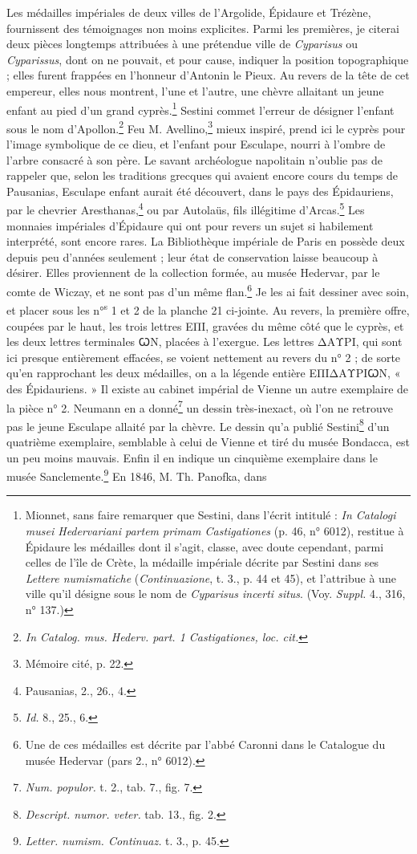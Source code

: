 \documentclass{article}
\begin{document}
Les médailles impériales de deux villes de l'Argolide, Épidaure et Trézène, fournissent des témoignages non moins explicites. Parmi les premières, je citerai deux pièces longtemps attribuées à une prétendue ville de \emph{Cyparisus} ou \emph{Cyparissus}, dont on ne pouvait, et pour cause, indiquer la position topographique ; elles furent frappées en l'honneur d'Antonin le Pieux. Au revers de la tête de cet empereur, elles nous montrent, l'une et l'autre, une chèvre allaitant un jeune enfant au pied d'un grand cyprès.\footnote{Mionnet, sans faire remarquer que Sestini, dans l'écrit intitulé : \emph{In Catalogi musei Hedervariani partem primam Castigationes} (p. 46, n° 6012), restitue à Épidaure les médailles dont il s'agit, classe, avec doute cependant, parmi celles de l'île de Crète, la médaille impériale décrite par Sestini dans ses \emph{Lettere numismatiche} (\emph{Continuazione}, t. 3., p. 44 et 45), et l'attribue à une ville qu'il désigne sous le nom de \emph{Cyparisus incerti situs}. (Voy. \emph{Suppl.} 4., 316, n° 137.)} Sestini commet l'erreur de désigner l'enfant sous le nom d'Apollon.\footnote{\emph{In Catalog. mus. Hederv. part. 1 Castigationes, loc. cit.}} Feu M. Avellino,\footnote{Mémoire cité, p. 22.} mieux inspiré, prend ici le cyprès pour l'image symbolique de ce dieu, et l'enfant pour Esculape, nourri à l'ombre de l'arbre consacré à son père. Le savant archéologue napolitain n'oublie pas de rappeler que, selon les traditions grecques qui avaient encore cours du temps de Pausanias, Esculape enfant aurait été découvert, dans le pays des Épidauriens, par le chevrier Aresthanas,\footnote{Pausanias, 2., 26., 4.} ou par Autolaüs, fils illégitime d'Arcas.\footnote{\emph{Id.} 8., 25., 6.} Les monnaies impériales d'Épidaure qui ont pour revers un sujet si habilement interprété, sont encore rares. La Bibliothèque impériale de Paris en possède deux depuis peu d'années seulement ; leur état de conservation laisse beaucoup à désirer. Elles proviennent de la collection formée, au musée Hedervar, par le comte de Wiczay, et ne sont pas d'un même flan.\footnote{Une de ces médailles est décrite par l'abbé Caronni dans le Catalogue du musée Hedervar (pars 2., n° 6012).} Je les ai fait dessiner avec soin, et placer sous les n°\textsuperscript{s} 1 et 2 de la planche 21 ci-jointe. Au revers, la première offre, coupées par le haut, les trois lettres \textgreek{ΕΠΙ}, gravées du même côté que le cyprès, et les deux lettres terminales \textgreek{ꞶΝ}, placées à l'exergue. Les lettres \textgreek{ΔΑΥΡΙ}, qui sont ici presque entièrement effacées, se voient nettement au revers du n° 2 ; de sorte qu'en rapprochant les deux médailles, on a la légende entière \textgreek{ΕΠΙΔΑΥΡΙꞶΝ}, « des Épidauriens. » Il existe au cabinet impérial de Vienne un autre exemplaire de la pièce n° 2. Neumann en a donné\footnote{\emph{Num. populor.} t. 2., tab. 7., fig. 7.} un dessin très-inexact, où l'on ne retrouve pas le jeune Esculape allaité par la chèvre. Le dessin qu'a publié Sestini\footnote{\emph{Descript. numor. veter.} tab. 13., fig. 2.} d'un quatrième exemplaire, semblable à celui de Vienne et tiré du musée Bondacca, est un peu moins mauvais. Enfin il en indique un cinquième exemplaire dans le musée Sanclemente.\footnote{\emph{Letter. numism. Continuaz.} t. 3., p. 45.} En 1846, M. Th. Panofka, dans 
\end{document}
